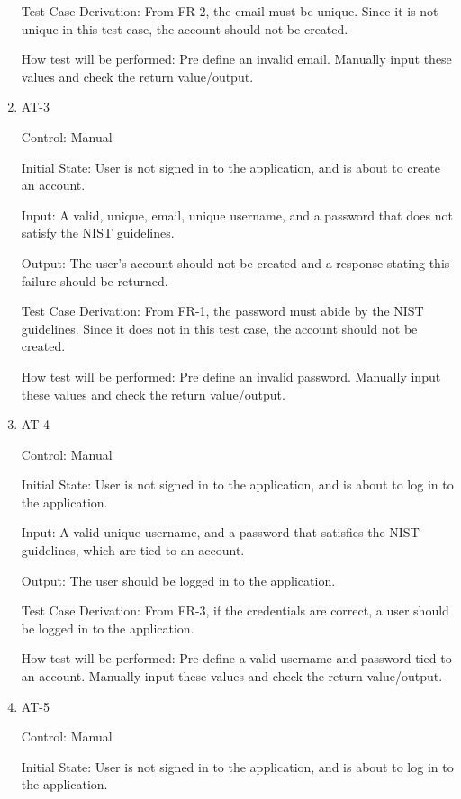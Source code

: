 \documentclass[12pt, titlepage]{article}
\begin{document}
\begin{enumerate}
Test Case Derivation: From FR-2, the email must be unique. Since it is not unique in this test case, the account should not 
be created.

How test will be performed: Pre define an invalid email. Manually input these values and check the return value/output.

\item{AT-3\\}

Control: Manual
					
Initial State: User is not signed in to the application, and is about to create an account.
					
Input: A valid, unique, email, unique username, and a password that does not satisfy the NIST guidelines.
					
Output: The user's account should not be created and a response stating this failure should be returned.

Test Case Derivation: From FR-1, the password must abide by the NIST guidelines. Since it does not in this test case, the account should not 
be created.

How test will be performed: Pre define an invalid password. Manually input these values and check the return value/output.


\item{AT-4\\}

Control: Manual
					
Initial State: User is not signed in to the application, and is about to log in to the application.
					
Input: A valid unique username, and a password that satisfies the NIST guidelines, which are tied to an account.
					
Output: The user should be logged in to the application.

Test Case Derivation: From FR-3, if the credentials are correct, a user should be logged in to the application.

How test will be performed: Pre define a valid username and password tied to an account. Manually input these values and check the return value/output.


\item{AT-5\\}

Control: Manual
					
Initial State: User is not signed in to the application, and is about to log in to the application.
					

\end{enumerate}
\end{document}
